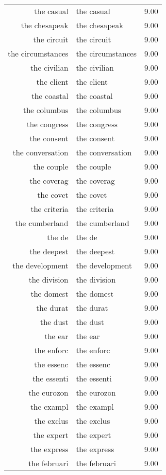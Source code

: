 \begin{table}[ht]
\begin{tabular}{rlr}
  the casual & the casual & 9.00 \\ 
  the chesapeak & the chesapeak & 9.00 \\ 
  the circuit & the circuit & 9.00 \\ 
  the circumstances & the circumstances & 9.00 \\ 
  the civilian & the civilian & 9.00 \\ 
  the client & the client & 9.00 \\ 
  the coastal & the coastal & 9.00 \\ 
  the columbus & the columbus & 9.00 \\ 
  the congress & the congress & 9.00 \\ 
  the consent & the consent & 9.00 \\ 
  the conversation & the conversation & 9.00 \\ 
  the couple & the couple & 9.00 \\ 
  the coverag & the coverag & 9.00 \\ 
  the covet & the covet & 9.00 \\ 
  the criteria & the criteria & 9.00 \\ 
  the cumberland & the cumberland & 9.00 \\ 
  the de & the de & 9.00 \\ 
  the deepest & the deepest & 9.00 \\ 
  the development & the development & 9.00 \\ 
  the division & the division & 9.00 \\ 
  the domest & the domest & 9.00 \\ 
  the durat & the durat & 9.00 \\ 
  the dust & the dust & 9.00 \\ 
  the ear & the ear & 9.00 \\ 
  the enforc & the enforc & 9.00 \\ 
  the essenc & the essenc & 9.00 \\ 
  the essenti & the essenti & 9.00 \\ 
  the eurozon & the eurozon & 9.00 \\ 
  the exampl & the exampl & 9.00 \\ 
  the exclus & the exclus & 9.00 \\ 
  the expert & the expert & 9.00 \\ 
  the express & the express & 9.00 \\ 
  the februari & the februari & 9.00 \\ 

\end{tabular}
\end{table}
